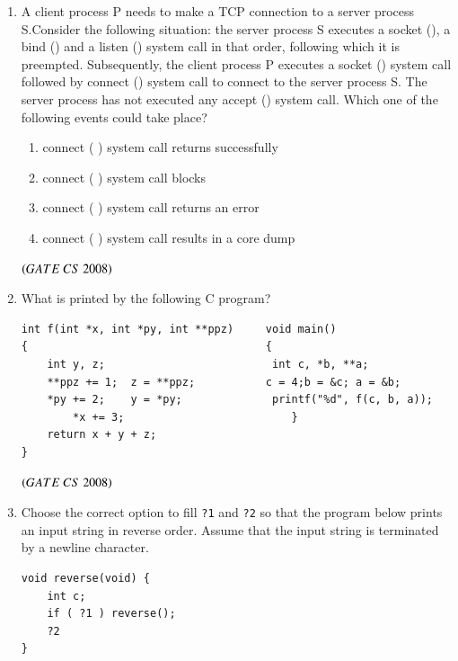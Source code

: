 \documentclass[journal]{IEEEtran}
\numberwithin{equation}{enumi}
\numberwithin{figure}{enumi}
\begin{document}
\begin{enumerate}
\item A client process P needs to make a TCP connection to a server process S.Consider the following situation: the server process S executes a socket (), a bind () and a listen () system call in that order, following which it is preempted. Subsequently, the client process P executes a socket () system call followed by connect () system call to connect to the server process S. The server process has not executed any accept () system call. Which one of the following events could take place? 
\begin{enumerate}
   \item  connect ( ) system call returns successfully
   \item  connect ( ) system call blocks
   \item connect ( ) system call returns an error
   \item connect ( ) system call results in a core dump 
\end{enumerate}    
\hfill $\left(GATE\ CS\  2008\right)$

\item What is printed by the following C program?
\begin{verbatim}
int f(int *x, int *py, int **ppz)     void main()
{                                     {
    int y, z;                          int c, *b, **a;
    **ppz += 1;  z = **ppz;           c = 4;b = &c; a = &b;
    *py += 2;    y = *py;              printf("%d", f(c, b, a));
        *x += 3;                          }
    return x + y + z;                  
}
\end{verbatim}

\begin{enumerate}
\end{enumerate}
\hfill $\left(GATE\ CS\  2008\right)$

\item Choose the correct option to fill \texttt{?1} and \texttt{?2} so that the program below prints an input string in reverse order. Assume that the input string is terminated by a newline character.
\begin{verbatim}
void reverse(void) {
    int c;
    if ( ?1 ) reverse();
    ?2
}


\end{verbatim}
\end{enumerate}
\end{document}

